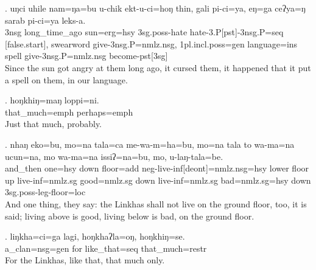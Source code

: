 \exg. uŋci uhile nam=ŋa=bu u-chik ekt-u-ci=hoŋ thin, gali pi-ci=ya,  eŋ=ga ceʔya=ŋ sarab pi-ci=ya leks-a.\\
{\sc 3nsg} long\_time\_ago sun{\sc =erg=hsy} {\sc 3sg.poss-}hate hate{\sc -3.P[pst]-3nsg.P=seq} [false.start], swearword give{\sc -3nsg.P=nmlz.nsg}, {\sc 1pl.incl.poss=gen} language{\sc =ins} spell give{\sc -3nsg.P=nmlz.nsg} become{\sc -pst[3sg]}\\
Since the sun got angry at them long ago, it cursed them, it happened that it put a spell on them, in our language.



\exg. hoŋkhiŋ=maŋ loppi=ni.\\
that\_much{\sc =emph} perhaps{\sc =emph}\\
Just that much, probably.



\exg. nhaŋ eko=bu, mo=na tala=ca me-wa-m=ha=bu, mo=na tala to wa-ma=na ucun=na, mo wa-ma=na issiʔ=na=bu, mo, u-laŋ-tala=be.\\
and\_then one{\sc =hsy} down floor{\sc =add} {\sc neg-}live{\sc -inf[deont]=nmlz.nsg=hsy} lower floor up live{\sc -inf=nmlz.sg} good{\sc =nmlz.sg} down live{\sc -inf=nmlz.sg} bad{\sc =nmlz.sg=hsy} down {\sc 3sg.poss}-leg-floor{\sc =loc}\\
And one thing, they say: the Linkhas shall not live on the ground floor, too, it is said; living above is good, living below is bad, on the
ground floor.


\exg. liŋkha=ci=ga lagi, hoŋkhaʔla=oŋ, hoŋkhiŋ=se.\\
a\_clan{\sc =nsg=gen} for like\_that{\sc =seq} that\_much{\sc =restr}\\
For the Linkhas, like that, that much only.



